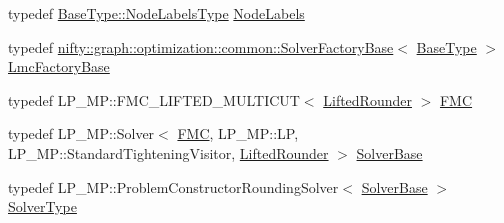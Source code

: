 \begin{DoxyCompactItemize}
\item 
typedef \hyperlink{classnifty_1_1graph_1_1optimization_1_1common_1_1SolverBase_a6e4e465f3b6e039882669fcfb9714818}{Base\+Type\+::\+Node\+Labels\+Type} \hyperlink{classnifty_1_1graph_1_1optimization_1_1lifted__multicut_1_1LiftedMulticutMp_a4b0695b3277f6b10aed84ce6e121052a}{Node\+Labels}
\item 
typedef \hyperlink{classnifty_1_1graph_1_1optimization_1_1common_1_1SolverFactoryBase}{nifty\+::graph\+::optimization\+::common\+::\+Solver\+Factory\+Base}$<$ \hyperlink{classnifty_1_1graph_1_1optimization_1_1lifted__multicut_1_1LiftedMulticutMp_a2f72b0242500bbb04eb1fc7279ead53a}{Base\+Type} $>$ \hyperlink{classnifty_1_1graph_1_1optimization_1_1lifted__multicut_1_1LiftedMulticutMp_a8158b134add34830756f55f8453134d6}{Lmc\+Factory\+Base}
\item 
typedef L\+P\+\_\+\+M\+P\+::\+F\+M\+C\+\_\+\+L\+I\+F\+T\+E\+D\+\_\+\+M\+U\+L\+T\+I\+C\+U\+T$<$ \hyperlink{structnifty_1_1graph_1_1optimization_1_1lifted__multicut_1_1LiftedMulticutMp_1_1LiftedRounder}{Lifted\+Rounder} $>$ \hyperlink{classnifty_1_1graph_1_1optimization_1_1lifted__multicut_1_1LiftedMulticutMp_af7d13f50102d758dbbc7aba37dbf3b0b}{F\+M\+C}
\item 
typedef L\+P\+\_\+\+M\+P\+::\+Solver$<$ \hyperlink{classnifty_1_1graph_1_1optimization_1_1lifted__multicut_1_1LiftedMulticutMp_af7d13f50102d758dbbc7aba37dbf3b0b}{F\+M\+C}, L\+P\+\_\+\+M\+P\+::\+L\+P, L\+P\+\_\+\+M\+P\+::\+Standard\+Tightening\+Visitor, \hyperlink{structnifty_1_1graph_1_1optimization_1_1lifted__multicut_1_1LiftedMulticutMp_1_1LiftedRounder}{Lifted\+Rounder} $>$ \hyperlink{classnifty_1_1graph_1_1optimization_1_1lifted__multicut_1_1LiftedMulticutMp_acf2283e9b202825cdc4b0732d88fe639}{Solver\+Base}
\item 
typedef L\+P\+\_\+\+M\+P\+::\+Problem\+Constructor\+Rounding\+Solver$<$ \hyperlink{classnifty_1_1graph_1_1optimization_1_1lifted__multicut_1_1LiftedMulticutMp_acf2283e9b202825cdc4b0732d88fe639}{Solver\+Base} $>$ \hyperlink{classnifty_1_1graph_1_1optimization_1_1lifted__multicut_1_1LiftedMulticutMp_a687e7439ccc74f27d0b9e975ba874666}{Solver\+Type}
\end{DoxyCompactItemize}
